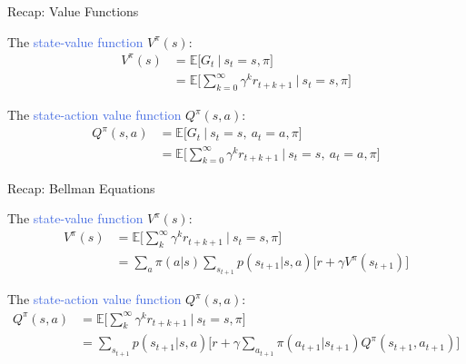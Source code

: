 \documentclass{beamer}
\begin{document}
\begin{frame}{Recap: Value Functions}

The \textcolor{RoyalBlue}{state-value function} $V^{\pi}(s)$:
\begin{align*}
	V^{\pi}(s) & = \mathds{E} \bigg[G_t \: \big| \: s_t=s,\pi \bigg] \\ 
		& = \mathds{E} \bigg[\sum_{k=0}^{\infty}\gamma^{k} r_{t+k+1} \: \bigg| \: s_t=s,\pi \bigg]
\end{align*}

The \textcolor{RoyalBlue}{state-action value function} $Q^{\pi}(s,a)$:
\begin{align*}
	Q^{\pi}(s,a) & = \mathds{E} \bigg[G_t \: \big| \: s_t=s, \: a_t=a,  \pi \bigg] \\ 
		& = \mathds{E} \bigg[\sum_{k=0}^{\infty}\gamma^{k} r_{t+k+1} \: \bigg| \: s_t=s, \: a_t=a, \pi \bigg]
\end{align*}
		
\end{frame}


\begin{frame}{Recap: Bellman Equations}

The \textcolor{RoyalBlue}{state-value function} $V^{\pi}(s)$:
\begin{align*}
			V^{\pi}(s) & = \mathds{E} \bigg[\sum_{k}^{\infty}\gamma^{k} r_{t+k+1} \: \bigg| \: s_t=s,\pi \bigg] \\
			   & = \sum_a \pi(a|s) \sum_{s_{t+1}} p(s_{t+1}|s,a)\big[r + \gamma V^{\pi}(s_{t+1}) \big] 
		\end{align*}

The \textcolor{RoyalBlue}{state-action value function} $Q^{\pi}(s,a)$:
\begin{align*}
	Q^{\pi}(s,a) & = \mathds{E} \bigg[\sum_{k}^{\infty}\gamma^{k} r_{t+k+1} \: \bigg| \: s_t=s,\pi \bigg] \\
			   & = \sum_{s_{t+1}} p(s_{t+1}|s,a)\big[r + \gamma \sum_{a_{t+1}} \pi(a_{t+1}|s_{t+1}) Q^{\pi}(s_{t+1}, a_{t+1}) \big]
\end{align*}
		
\end{frame}
\end{document}
